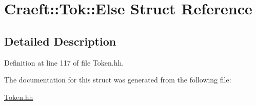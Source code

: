 \hypertarget{struct_craeft_1_1_tok_1_1_else}{}\section{Craeft\+:\+:Tok\+:\+:Else Struct Reference}
\label{struct_craeft_1_1_tok_1_1_else}


\subsection{Detailed Description}


Definition at line 117 of file Token.\+hh.



The documentation for this struct was generated from the following file\+:\begin{DoxyCompactItemize}
\item 
\hyperlink{_token_8hh}{Token.\+hh}\end{DoxyCompactItemize}
